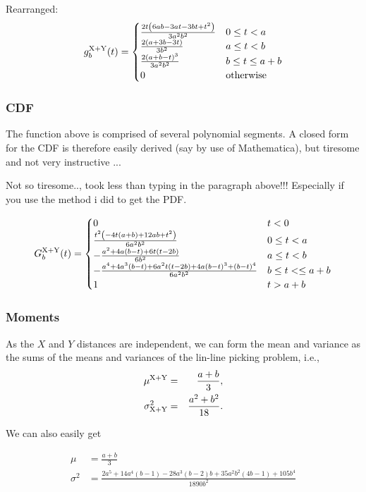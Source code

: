 Rearranged:
\begin{equation}
 g^{\rm X+Y}_b(t) =
 \begin{cases}
 \frac{2 t \left(6 a b-3 a t-3 b t+t^2\right)}{3 a^2 b^2}& 0 \le t < a \\
\frac{2 (a+3 b-3 t)}{3 b^2} & a \le t <  b \\
\frac{2 (a+b-t)^3}{3 a^2 b^2} & b \le t \le  a + b\\
 0 & \mbox{otherwise}
 \end{cases}
\end{equation}

\subsubsection{CDF}

The function above is comprised of several polynomial segments. A
closed form for the CDF is therefore easily derived (say by use of
Mathematica), but tiresome and not very instructive ...

Not so tiresome.., took less than typing in the paragraph above!!!
Especially if you use the method i did to get the PDF.

\begin{equation}
 G^{\rm X+Y}_b(t) =
 \begin{cases}
 0 & t < 0\\
\frac{t^2 \left(-4 t (a+b)+12 a b+t^2\right)}{6 a^2 b^2} & 0 \le t < a \\
-\frac{a^2+4 a (b-t)+6 t (t-2 b)}{6 b^2} & a\le t <  b \\
-\frac{a^4+4 a^3 (b-t)+6 a^2 t (t-2 b)+4 a (b-t)^3+(b-t)^4}{6 a^2 b^2} & b \le t < \le  a + b\\
 1 & t > a + b
 \end{cases}
\end{equation}


\subsubsection{Moments}

As the $X$ and $Y$ distances are independent, we can form the mean and
variance as the sums of the means and variances of the lin-line
picking problem, i.e.,
\begin{eqnarray}
  \mu^{\rm X+Y} & = & \frac{a+b}{3}, \\
  \label{eq:rect_man_mean}
  \sigma^2_{\rm X+Y}
      & = & \frac{a^{2} + b^2}{18}.
  \label{eq:rect_man_var}
\end{eqnarray}



We can also easily get 

\begin{eqnarray}
 \mu & = \frac{a+b}{3} \\
 \sigma^{2} & = \frac{2 a^5+14 a^4 (b-1)-28 a^3 (b-2) b+35 a^2 b^2 (4 b-1)+105 b^4}{1890 b^2}
\end{eqnarray}






